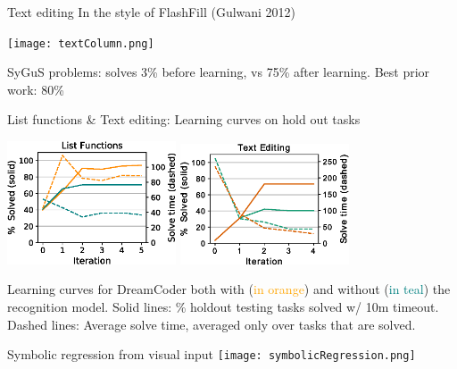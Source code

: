 \documentclass{beamer}
\newcommand{\orange}[1]{\textcolor{orange}{#1}}
\newcommand{\teal}[1]{\textcolor{teal}{#1}}
\begin{document}
\begin{frame}{Text editing}
  In the style of FlashFill (Gulwani 2012)

  \centering  \texttt{[image: textColumn.png]}

\vspace{-0.5cm}  SyGuS problems: solves 3\% before learning, vs 75\% after learning. Best prior work: 80\%

\end{frame}
\begin{frame}{List functions \& Text editing: Learning curves on hold out tasks}

  \begin{center}
    \includegraphics[width = 5cm]{figures/listLearningCurve.eps}
\hfill    \includegraphics[width = 5cm]{figures/textLearningCurve.eps} 
    \end{center}

Learning curves for DreamCoder both with (\orange{in orange}) and without
    (\teal{in teal}) the recognition model. Solid lines: \% holdout testing tasks solved w/ 10m timeout. Dashed lines: Average solve time, averaged only over tasks that are solved.


\end{frame}

\begin{frame}{Symbolic regression from visual input}
\centering\texttt{[image: symbolicRegression.png]}
\end{frame}
\end{document}

